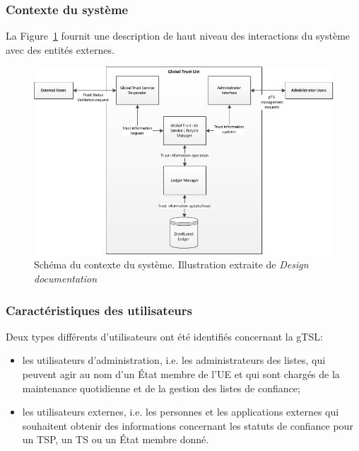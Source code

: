 \documentclass{tnreport}
\begin{document}
\subsubsection{Contexte du système}
La Figure~\ref{fig:system-context-diagram} fournit une description de haut niveau des interactions du système avec des entités externes.
\begin{figure}[h]
	\centering
	\includegraphics[scale=0.82]{figures/gTSL-SystemContextDiagram}
	\caption{Schéma du contexte du système. Illustration extraite de \textit{Design documentation}~\cite{design-document}}
	\label{fig:system-context-diagram}
\end{figure}
\fi


\subsubsection{Caractéristiques des utilisateurs}

Deux types différents d'utilisateurs ont été identifiés concernant la gTSL:
\begin{itemize}
	\item les utilisateurs d'administration, i.e. les administrateurs des listes, qui peuvent agir au nom d'un État membre de l'UE et qui sont chargés de la maintenance quotidienne et de la gestion des listes de confiance;
	\item les utilisateurs externes, i.e. les personnes et les applications externes qui souhaitent obtenir des informations concernant les statuts de confiance pour un TSP, un TS ou un État membre donné.
	\newline
\end{itemize}
\end{document}
